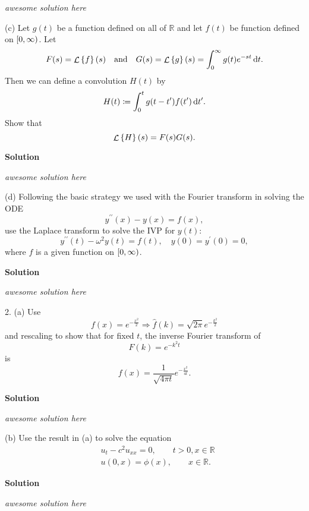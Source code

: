\documentclass{article}
\DeclareMathOperator{\Lagr}{\mathcal{L}}
\begin{document}
\textit{awesome solution here}

\vspace{5mm}

(c) Let $g(t)$ be a function defined on all of $\mathbb{R}$ and let
$f(t)$ be function defined on $\intco{0, \infty}$. Let
%
\begin{equation*}
    F(s) = \Lagr \cbr{f}(s)
    \quad \text{and} \quad
    G(s) = \Lagr \cbr{g}(s) = \int_0^\infty g(t) e^{-s t} \dif t
    .
\end{equation*}
%
Then we can define a convolution $H(t)$ by
%
\begin{equation*}
    H(t) \coloneqq \int_0^t g(t - t^\prime) f(t^\prime) \dif t^\prime
    .
\end{equation*}
%
Show that
%
\begin{equation*}
    \Lagr \cbr{H}(s) = F(s) G(s)
    .
\end{equation*}

\textbf{Solution}

\textit{awesome solution here}

\vspace{5mm}

(d) Following the basic strategy we used with the Fourier transform in
solving the ODE
%
\begin{equation*}
    y^{\prime \prime}(x) - y(x) = f(x)
    ,
\end{equation*}
%
use the Laplace transform to solve the IVP for $y(t)$:
%
\begin{equation*}
    y^{\prime \prime}(t) - \omega^2 y(t) = f(t)
    ,\quad
    y(0) = y^\prime(0) = 0
    ,
\end{equation*}
%
where $f$ is a given function on $\intco{0, \infty}$.

\textbf{Solution}

\textit{awesome solution here}

\newpage

2. (a) Use
%
\begin{equation*}
    f(x) = e^{- \frac{x^2}{2}} \Rightarrow \widehat{f}(k) = \sqrt{2 \pi} e^{- \frac{k^2}{2}}
\end{equation*}
%
and rescaling to show that for fixed $t$, the inverse Fourier transform of
%
\begin{equation*}
    F(k) = e^{- k^2 t}
\end{equation*}
%
is
%
\begin{equation*}
    f(x) = \frac{1}{\sqrt{4 \pi t}} e^{- \frac{x^2}{4 t}}
    .
\end{equation*}

\textbf{Solution}

\textit{awesome solution here}

\vspace{5mm}

(b) Use the result in (a) to solve the equation
%
\begin{align*}
    &u_t - c^2 u_{x x} = 0, \quad \quad t > 0, x \in \mathbb{R} \\
    &u(0, x) = \phi(x), \quad \quad x \in \mathbb{R}
    .
\end{align*}

\textbf{Solution}

\textit{awesome solution here}
\end{document}
